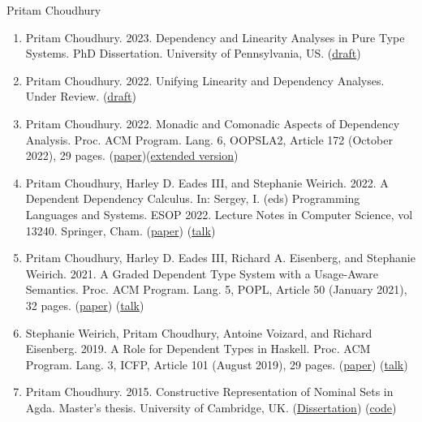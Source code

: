 \documentclass{scrartcl}
\begin{document}
\begin{cv}{Pritam Choudhury}
\begin{enumerate}
\item Pritam Choudhury. 2023. Dependency and Linearity Analyses in Pure Type Systems. PhD Dissertation. University of Pennsylvania, US. (\href{https://github.com/pritamChoudhury/PhDDissertationDraft/tree/master/Dissertation.pdf}{draft})
\item Pritam Choudhury. 2022. Unifying Linearity and Dependency Analyses. Under Review. (\href{https://github.com/pritamChoudhury/UnderReviewPaper/blob/master/paper.pdf}{draft})
\item Pritam Choudhury. 2022. Monadic and Comonadic Aspects of Dependency Analysis. Proc. ACM Program. Lang. 6, OOPSLA2, Article 172 (October 2022), 29 pages. (\href{https://doi.org/10.1145/3563335}{paper})(\href{https://arxiv.org/abs/2209.06334}{extended version})
\item Pritam Choudhury, Harley D. Eades III, and Stephanie Weirich. 2022. A Dependent Dependency Calculus. In: Sergey, I. (eds) Programming Languages and Systems. ESOP 2022. Lecture Notes in Computer Science, vol 13240. Springer, Cham. (\href{https://doi.org/10.1007/978-3-030-99336-8_15}{paper}) (\href{https://www.youtube.com/watch?v=e_heE6IoN8Y}{talk})
\item Pritam Choudhury, Harley D. Eades III, Richard A. Eisenberg, and Stephanie Weirich. 2021. A Graded Dependent Type System with a Usage-Aware Semantics. Proc. ACM Program. Lang. 5, POPL, Article 50 (January 2021), 32 pages. (\href{https://dl.acm.org/doi/10.1145/3434331}{paper}) (\href{https://www.youtube.com/watch?v=yrwtXrey7mE}{talk})
\item Stephanie Weirich, Pritam Choudhury, Antoine Voizard, and Richard Eisenberg. 2019. A Role for Dependent Types in Haskell. Proc. ACM Program. Lang. 3, ICFP, Article 101 (August 2019), 29 pages. (\href{https://dl.acm.org/doi/abs/10.1145/3341705}{paper}) (\href{https://www.youtube.com/watch?v=0udX2HqFUD8}{talk})
\item Pritam Choudhury. 2015. Constructive Representation of Nominal Sets in Agda. Master’s thesis. University of Cambridge, UK. (\href{https://www.cl.cam.ac.uk/~amp12/agda/choudhury/choudhury-dissertation.pdf}{Dissertation}) (\href{https://www.cl.cam.ac.uk/~amp12/agda/choudhury/html/README.html}{code})
\end{enumerate}



\end{cv}
\end{document}
